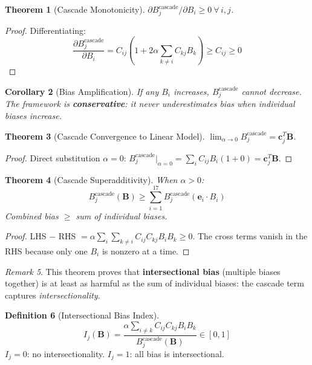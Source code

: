 \documentclass[12pt,a4paper]{report}
\theoremstyle{plain}
\newtheorem{theorem}{Theorem}[chapter]
\newtheorem{corollary}[theorem]{Corollary}
\theoremstyle{definition}
\newtheorem{definition}[theorem]{Definition}
\theoremstyle{remark}
\newtheorem{remark}[theorem]{Remark}
\newcommand{\biasvec}{\mathbf{B}}
\newcommand{\casc}{^{\text{cascade}}}
\begin{document}
\begin{theorem}[Cascade Monotonicity]
\label{thm:mono}
$\partial B_j\casc / \partial B_i \geq 0\ \forall\, i, j$.
\end{theorem}
\begin{proof}
Differentiating:
\begin{equation*}
    \frac{\partial B_j\casc}{\partial B_i}
    = C_{ij}\!\left(1 + 2\alpha \sum_{k \neq i} C_{kj} B_k\right)
    \geq C_{ij} \geq 0
\end{equation*}
\end{proof}

\begin{corollary}[Bias Amplification]
\label{cor:amplification}
If any $B_i$ increases, $B_j\casc$ cannot decrease.
The framework is \textbf{conservative}: it never
underestimates bias when individual biases increase.
\end{corollary}

\begin{theorem}[Cascade Convergence to Linear Model]
\label{thm:linear}
$\lim_{\alpha \to 0} B_j\casc = \mathbf{c}_j^T \biasvec$.
\end{theorem}
\begin{proof}
Direct substitution $\alpha = 0$:
$B_j\casc\big|_{\alpha=0} = \sum_i C_{ij} B_i (1+0)
= \mathbf{c}_j^T \biasvec$.
\end{proof}

\begin{theorem}[Cascade Superadditivity]
\label{thm:super}
When $\alpha > 0$:
\begin{equation}
    B_j\casc(\biasvec) \geq \sum_{i=1}^{17}
    B_j\casc(\mathbf{e}_i \cdot B_i)
\end{equation}
\emph{Combined bias $\geq$ sum of individual biases.}
\end{theorem}
\begin{proof}
LHS $-$ RHS $= \alpha \sum_{i} \sum_{k \neq i}
C_{ij} C_{kj} B_i B_k \geq 0$.
The cross terms vanish in the RHS because only
one $B_i$ is nonzero at a time.
\end{proof}

\begin{remark}
This theorem proves that \textbf{intersectional bias}
(multiple biases together) is at least as harmful as
the sum of individual biases: the cascade term captures
\emph{intersectionality}.
\end{remark}

\begin{definition}[Intersectional Bias Index]
\label{def:ibi}
\begin{equation}
    I_j(\biasvec) =
    \frac{\alpha \sum_{i \neq k} C_{ij} C_{kj} B_i B_k}
    {B_j\casc(\biasvec)} \in [0,1]
\end{equation}
$I_j = 0$: no intersectionality.\quad
$I_j = 1$: all bias is intersectional.
\end{definition}
\end{document}
